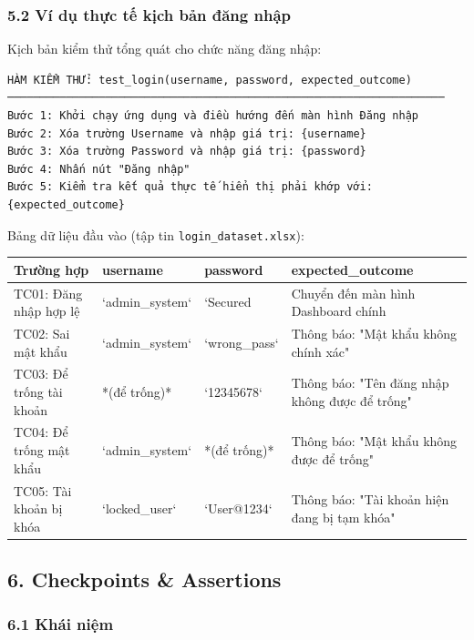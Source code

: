 \subsubsection{5.2 Ví dụ thực tế kịch bản đăng nhập}

Kịch bản kiểm thử tổng quát cho chức năng đăng nhập:

\begin{lstlisting}
HÀM KIỂM THỬ: test_login(username, password, expected_outcome)
───────────────────────────────────────────────────────────────────
Bước 1: Khởi chạy ứng dụng và điều hướng đến màn hình Đăng nhập
Bước 2: Xóa trường Username và nhập giá trị: {username}
Bước 3: Xóa trường Password và nhập giá trị: {password}
Bước 4: Nhấn nút "Đăng nhập"
Bước 5: Kiểm tra kết quả thực tế hiển thị phải khớp với: {expected_outcome}
\end{lstlisting}


Bảng dữ liệu đầu vào (tập tin \texttt{login_dataset.xlsx}):

\begin{table}[H]
\centering
\begin{tabular}{|l|l|l|l|}
\hline
\textbf{Trường hợp} & \textbf{username} & \textbf{password} & \textbf{expected_outcome} \\ \hline
TC01: Đăng nhập hợp lệ & `admin\_system` & `Secured#2026` & Chuyển đến màn hình Dashboard chính \\ \hline
TC02: Sai mật khẩu & `admin\_system` & `wrong\_pass` & Thông báo: "Mật khẩu không chính xác" \\ \hline
TC03: Để trống tài khoản & *(để trống)* & `12345678` & Thông báo: "Tên đăng nhập không được để trống" \\ \hline
TC04: Để trống mật khẩu & `admin\_system` & *(để trống)* & Thông báo: "Mật khẩu không được để trống" \\ \hline
TC05: Tài khoản bị khóa & `locked\_user` & `User@1234` & Thông báo: "Tài khoản hiện đang bị tạm khóa" \\ \hline
\end{tabular}
\end{table}





\subsection{6. Checkpoints \& Assertions}

\subsubsection{6.1 Khái niệm}

